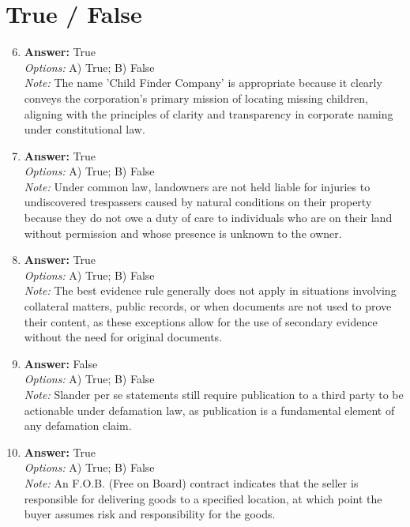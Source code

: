 \documentclass[12pt]{article}
\begin{document}
\section*{True / False}
\begin{enumerate}[label=\arabic*.]
\setcounter{enumi}{5}
\item \textbf{Answer:} True
\\ \textit{Options:} A) True; B) False
\\ \textit{Note:} The name 'Child Finder Company' is appropriate because it clearly conveys the corporation's primary mission of locating missing children, aligning with the principles of clarity and transparency in corporate naming under constitutional law.
\item \textbf{Answer:} True
\\ \textit{Options:} A) True; B) False
\\ \textit{Note:} Under common law, landowners are not held liable for injuries to undiscovered trespassers caused by natural conditions on their property because they do not owe a duty of care to individuals who are on their land without permission and whose presence is unknown to the owner.
\item \textbf{Answer:} True
\\ \textit{Options:} A) True; B) False
\\ \textit{Note:} The best evidence rule generally does not apply in situations involving collateral matters, public records, or when documents are not used to prove their content, as these exceptions allow for the use of secondary evidence without the need for original documents.
\item \textbf{Answer:} False
\\ \textit{Options:} A) True; B) False
\\ \textit{Note:} Slander per se statements still require publication to a third party to be actionable under defamation law, as publication is a fundamental element of any defamation claim.
\item \textbf{Answer:} True
\\ \textit{Options:} A) True; B) False
\\ \textit{Note:} An F.O.B. (Free on Board) contract indicates that the seller is responsible for delivering goods to a specified location, at which point the buyer assumes risk and responsibility for the goods.
\end{enumerate}
\end{document}
